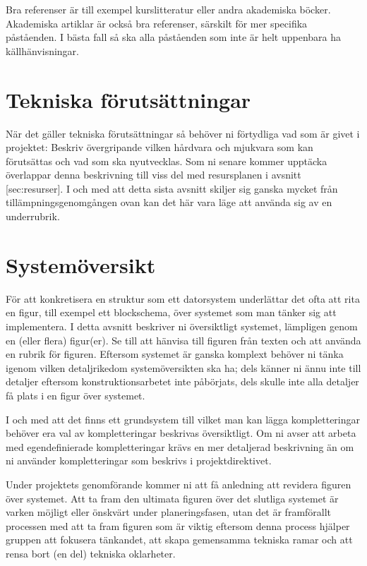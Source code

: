 \documentclass[a4paper]{article}
\begin{document}
Bra referenser är till exempel kurslitteratur eller andra akademiska
böcker. Akademiska artiklar är också bra referenser, särskilt för mer
specifika påståenden. I bästa fall så ska alla påståenden som inte är
helt uppenbara ha källhänvisningar.


\section{Tekniska förutsättningar}

När det gäller tekniska förutsättningar så behöver ni förtydliga vad som
är givet i projektet: Beskriv övergripande vilken hårdvara och mjukvara
som kan förutsättas och vad som ska nyutvecklas. Som ni senare kommer
upptäcka överlappar denna beskrivning till viss del med resursplanen i
avsnitt [sec:resurser]. I och med att detta sista avsnitt skiljer sig
ganska mycket från tillämpningsgenomgången ovan kan det här vara läge
att använda sig av en underrubrik.



\section{Systemöversikt}


För att konkretisera en struktur som ett datorsystem underlättar det
ofta att rita en figur, till exempel ett blockschema, över systemet som
man tänker sig att implementera. I detta avsnitt beskriver ni
översiktligt systemet, lämpligen genom en (eller flera) figur(er). Se
till att hänvisa till figuren från texten och att använda en rubrik för
figuren. Eftersom systemet är ganska komplext behöver ni tänka igenom
vilken detaljrikedom systemöversikten ska ha; dels känner ni ännu inte
till detaljer eftersom konstruktionsarbetet inte påbörjats, dels skulle
inte alla detaljer få plats i en figur över systemet.

I och med att det finns ett grundsystem till vilket man kan lägga
kompletteringar behöver era val av kompletteringar beskrivas
översiktligt. Om ni avser att arbeta med egendefinierade kompletteringar
krävs en mer detaljerad beskrivning än om ni använder kompletteringar
som beskrivs i projektdirektivet.

Under projektets genomförande kommer ni att få anledning att revidera
figuren över systemet. Att ta fram den ultimata figuren över det
slutliga systemet är varken möjligt eller önskvärt under
planeringsfasen, utan det är framförallt processen med att ta fram
figuren som är viktig eftersom denna process hjälper gruppen att
fokusera tänkandet, att skapa gemensamma tekniska ramar och att rensa
bort (en del) tekniska oklarheter.
\end{document}
